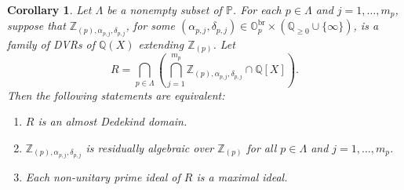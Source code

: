 \documentclass[10pt]{article}
\numberwithin{equation}{section}
\newtheorem{Cor}[equation]{Corollary}
\theoremstyle{definition}
\theoremstyle{definition}
\newcommand{\Q}{\mathbb{Q}}
\newcommand{\Z}{\mathbb{Z}}
\renewcommand{\O}{\mathbb{O}}
\newcommand{\PP}{\mathbb{P}}
\newcommand{\br}{\text{br}}
\begin{document}
\begin{Cor} \label{coro1}
Let $\Lambda$ be a nonempty subset of $\PP$.
For each $p \in \Lambda$ and $j=1, \dots, m_p$, suppose that $\Z_{(p),\alpha_{p,j},\delta_{p,j}}$,
for some $(\alpha_{p,j},\delta_{p,j})\in \O_p^{\br}\times(\Q_{\geq0}\cup\{\infty\})$, is a family of DVRs of $\Q(X)$ extending $\Z_{(p)}$.  
Let
\begin{equation}\label{representation R4}
R = \bigcap_{p \in \Lambda} (\bigcap_{j=1}^{m_p}\Z_{(p),\alpha_{p,j},\delta_{p,j}} \cap\Q[X]).
\end{equation}
Then the following statements are equivalent:
\begin{enumerate}
\item[{\em (1)}] $R$ is an almost Dedekind domain.
\item[{\em (2)}] $\Z_{(p),\alpha_{p,j},\delta_{p,j}}$
is residually algebraic over $\Z_{(p)}$ for all $p \in \Lambda$ and $j =1, \dots, m_p$.
\item[{\em (3)}] Each non-unitary prime ideal of $R$ is a maximal ideal. 
\end{enumerate}
\end{Cor}
\end{document}
